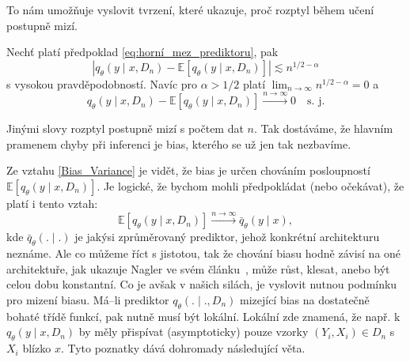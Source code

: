 To nám umožňuje vyslovit tvrzení, které ukazuje, proč rozptyl během učení postupně mizí.
\begin{theorem}
    Nechť platí předpoklad \ref{eq:horní_mez_prediktoru}, pak
    \begin{equation}
        \left| q_\theta(y \mid x, D_n) - \mathbb{E}[q_\theta(y \mid x, D_n)] \right| \lesssim n^{1/2 - \alpha}
    \end{equation}
    s vysokou pravděpodobností. 
    Navíc pro $\alpha > 1/2$ platí $\lim_{n \to \infty} n^{1/2-\alpha} = 0$ a 
    \begin{equation}
        q_\theta(y \mid x, D_n) - \mathbb{E}[q_\theta(y \mid x, D_n)] \xrightarrow{n \to \infty} 0 \quad \text{s. j.}
    \end{equation}
\end{theorem}
Jinými slovy rozptyl postupně mizí s počtem dat $n$.
Tak dostáváme, že hlavním pramenem chyby při inferenci je bias, kterého se už jen tak nezbavíme.
\par   

Ze vztahu \ref{Bias_Variance} je vidět, že bias je určen chováním posloupností $\mathbb{E}[q_\theta(y \mid x, D_n)]$.
Je logické, že bychom mohli předpokládat (nebo očekávat), že platí i tento vztah: 
$$\mathbb{E}[q_\theta(y \mid x, D_n)] \xrightarrow{n \to \infty} \bar{q}_\theta(y \mid x),$$
kde $\bar{q}_\theta(. \mid .)$ je jakýsi zprůměrovaný prediktor, jehož konkrétní architekturu neznáme.
Ale co můžeme říct s jistotou, tak že chování biasu hodně závisí na oné architektuře, jak ukazuje Nagler ve svém článku~\cite{nagler2023}, může růst, klesat, anebo být celou dobu konstantní.
Co je avšak v našich silách, je vyslovit nutnou podmínku pro mizení biasu. 
Má–li prediktor $q_\theta(. \mid ., D_n)$ mizející bias na dostatečně bohaté třídě funkcí, pak nutně musí být lokální.
Lokální zde znamená, že např. k $q_\theta(y \mid x, D_n)$ by měly přispívat (asymptoticky) pouze vzorky $(Y_i, X_i) \in D_n$ s $X_i$ blízko $x$.
Tyto poznatky dává dohromady následující věta.

